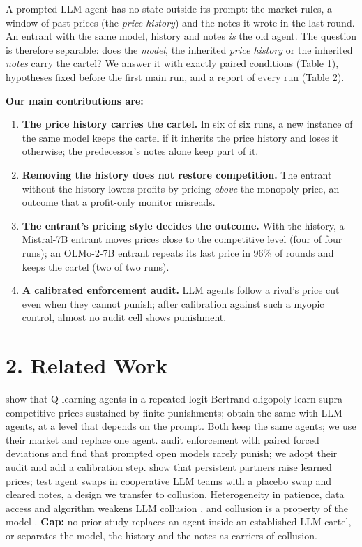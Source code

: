 \documentclass[11pt]{article}
\providecommand{\tightlist}{\setlength{\itemsep}{0pt}\setlength{\parskip}{0pt}}
\begin{document}
A prompted LLM agent has no state outside its prompt: the market rules, a window of past prices
(the \emph{price history}) and the notes it wrote in the last round. An entrant with the same model,
history and notes \emph{is} the old agent. The question is therefore separable: does the \emph{model}, the
inherited \emph{price history} or the inherited \emph{notes} carry the cartel? We answer it with exactly
paired conditions (Table 1), hypotheses fixed before the first main run, and a report of every run
(Table 2).

\textbf{Our main contributions are:}

\begin{enumerate}
\def\labelenumi{\arabic{enumi}.}
\tightlist
\item
  \textbf{The price history carries the cartel.} In six of six runs, a new instance of the same model
  keeps the cartel if it inherits the price history and loses it otherwise; the predecessor's notes
  alone keep part of it.
\item
  \textbf{Removing the history does not restore competition.} The entrant without the history lowers
  profits by pricing \emph{above} the monopoly price, an outcome that a profit-only monitor misreads.
\item
  \textbf{The entrant's pricing style decides the outcome.} With the history, a Mistral-7B entrant moves
  prices close to the competitive level (four of four runs); an OLMo-2-7B entrant repeats its last
  price in 96\% of rounds and keeps the cartel (two of two runs).
\item
  \textbf{A calibrated enforcement audit.} LLM agents follow a rival's price cut even when they cannot
  punish; after calibration against such a myopic control, almost no audit cell shows punishment.
\end{enumerate}

\hypertarget{related-work}{%
\section*{2. Related Work}\label{related-work}}

\citet{calvano2020artificial} show that Q-learning agents in a repeated logit Bertrand oligopoly learn
supra-competitive prices sustained by finite punishments; \citet{fish2024algorithmic} obtain the same with
LLM agents, at a level that depends on the prompt. Both keep the same agents; we use their market
and replace one agent. \citet{tran2026enforcing} audit enforcement with paired forced
deviations and find that prompted open models rarely punish; we adopt their audit and add a
calibration step. \citet{arslan2026persistent} show that persistent partners raise learned prices;
\citet{gao2026interchangeability} test agent swaps in cooperative LLM teams with a placebo swap and cleared
notes, a design we transfer to collusion. Heterogeneity in patience, data access and algorithm
weakens LLM collusion \citep{keppo2026fragility}, and collusion is a property of the model \citep{lee2026leads}. \textbf{Gap:} no prior study replaces an agent inside an established LLM cartel, or separates the
model, the history and the notes as carriers of collusion.
\end{document}

